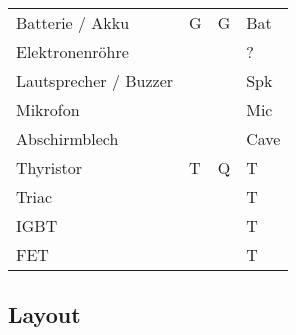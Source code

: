 \begin{table}[h!]
\begin{tabular}{llll}
  \rowcolor{lgray}  Batterie / Akku       & G             & G                 & Bat \\
  \rowcolor{white}  Elektronenröhre       &               &                   & ? \\
  \rowcolor{lgray}  Lautsprecher / Buzzer &               &                   & Spk \\
  \rowcolor{white}  Mikrofon              &               &                   & Mic \\
  \rowcolor{lgray}  Abschirmblech         &               &                   & Cave \\
  \rowcolor{white}  Thyristor             & T             & Q                 & T \\
  \rowcolor{lgray}  Triac                 &               &                   & T \\
  \rowcolor{white}  IGBT                  &               &                   & T \\
  \rowcolor{lgray}  FET                   &               &                   & T
  \end{tabular}
\end{table}

\subsection{Layout}